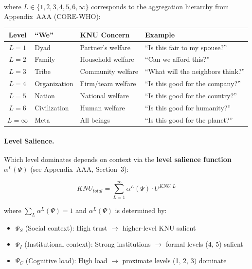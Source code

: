 where $L \in \{1, 2, 3, 4, 5, 6, \infty\}$ corresponds to the aggregation hierarchy
from Appendix~AAA (CORE-WHO):

\begin{center}
\renewcommand{\arraystretch}{1.2}
\begin{tabular}{clll}
\toprule
\textbf{Level} & \textbf{``We''} & \textbf{KNU Concern} & \textbf{Example} \\
\midrule
$L = 1$ & Dyad & Partner's welfare & ``Is this fair to my spouse?'' \\
$L = 2$ & Family & Household welfare & ``Can we afford this?'' \\
$L = 3$ & Tribe & Community welfare & ``What will the neighbors think?'' \\
$L = 4$ & Organization & Firm/team welfare & ``Is this good for the company?'' \\
$L = 5$ & Nation & National welfare & ``Is this good for the country?'' \\
$L = 6$ & Civilization & Human welfare & ``Is this good for humanity?'' \\
$L = \infty$ & Meta & All beings & ``Is this good for the planet?'' \\
\bottomrule
\end{tabular}
\end{center}

\paragraph{Level Salience.}
Which level dominates depends on context via the \textbf{level salience function}
$\alpha^L(\Psi)$ (see Appendix~AAA, Section~3):

\begin{equation}
KNU_{total} = \sum_{L=1}^{\infty} \alpha^L(\Psi) \cdot U^{KNU,L}
\label{eq:knu-aggregation}
\end{equation}

where $\sum_L \alpha^L(\Psi) = 1$ and $\alpha^L(\Psi)$ is determined by:
\begin{itemize}[nosep]
\item $\Psi_S$ (Social context): High trust $\rightarrow$ higher-level KNU salient
\item $\Psi_I$ (Institutional context): Strong institutions $\rightarrow$ formal levels (4, 5) salient
\item $\Psi_C$ (Cognitive load): High load $\rightarrow$ proximate levels (1, 2, 3) dominate
\end{itemize}

